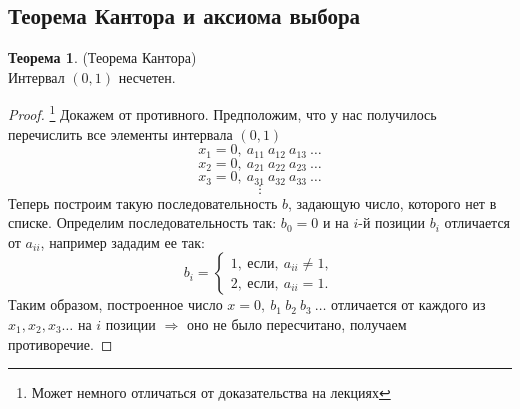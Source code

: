 \documentclass[a4paper, 12pt]{article}
\newcommand\tab[1][.5cm]{\hspace*{#1}}
\theoremstyle{definition}
\newtheorem*{theorem}{Теорема}
\begin{document}
        \subsection{Теорема Кантора и аксиома выбора}
        \begin{theorem} (Теорема Кантора)\\
            Интервал $(0,1)$ несчетен.
        \end{theorem}
        \begin{proof}\footnote{Может немного отличаться от доказательства на лекциях}
            Докажем от противного. Предположим, что у нас получилось перечислить все элементы интервала $(0,1)$ 
            \[x_1=0,\ a_{11}\ a_{12}\ a_{13}\ \dots\]
            \[x_2=0,\ a_{21}\ a_{22}\ a_{23}\ \dots\]
            \[x_3=0,\ a_{31}\ a_{32}\ a_{33}\ \dots\]
            \[\vdots\]
            \newpage
            Теперь построим такую последовательность $b$, задающую число, которого нет в списке. Определим последовательность так: $b_0 = 0$ и на $i$-й позиции $b_i$ отличается от $a_{ii}$, например зададим ее так:
            \[b_i=
            \begin{cases}
                1,\ \text{если},\ a_{ii}\ne 1,\\
                2,\ \text{если},\ a_{ii}=1.
            \end{cases}\]
            Таким образом, построенное число $x = 0,\ b_1\ b_2\ b_3\ \dots$ отличается от каждого из $x_1,x_2,x_3\dots$ на $i$ позиции $\Rightarrow$ оно не было пересчитано, получаем противоречие.
        \end{proof} 
\end{document}
